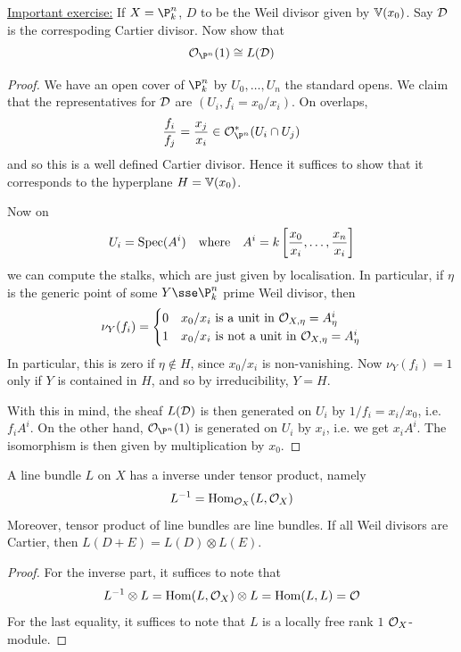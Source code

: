 \documentclass{article}
\begin{document}
\underline{Important exercise:} If \(X = \P^n_k\), \(D\) to be the Weil divisor given by \(\mathbb{V}(x_0)\). Say \(\mathcal{D}\) is the correspoding Cartier divisor. Now show that
\[\mcO_{\P^n}(1) \cong L(\mcD)\]

\begin{addendum}
    \begin{proof}
        We have an open cover of \(\P^n_k\) by \(U_0, \dots, U_n\) the standard opens. We claim that the representatives for \(\mathcal{D}\) are \((U_i, f_i = x_0/x_i)\). On overlaps,
        \[\frac{f_i}{f_j} = \frac{x_j}{x_i} \in \mcO^*_{\P^n}(U_i \cap U_j)\]
        and so this is a well defined Cartier divisor. Hence it suffices to show that it corresponds to the hyperplane \(H = \mathbb{V}(x_0)\).

        Now on
        \[U_i = \Spec(A^i) \qqtext{where}A^i = k\left[\frac{x_0}{x_i}, \dots, \frac{x_n}{x_i}\right]\]
        we can compute the stalks, which are just given by localisation. In particular, if \(\eta\) is the generic point of some \(Y \sse \P^n_k\) prime Weil divisor, then
        \[\nu_Y(f_i) = \begin{cases}
            0 & x_0/x_i \text{ is a unit in }\mathcal{O}_{X, \eta} = A^i_\eta \\
            1 & x_0/x_i \text{ is not a unit in }\mathcal{O}_{X, \eta} = A^i_\eta
        \end{cases}\]
        In particular, this is zero if \(\eta \notin H\), since \(x_0/x_i\) is non-vanishing. Now \(\nu_Y(f_i) = 1\) only if \(Y\) is contained in \(H\), and so by irreducibility, \(Y = H\). 
        
        With this in mind, the sheaf \(L(\mathcal{D})\) is then generated on \(U_i\) by \(1/f_i = x_i/x_0\), i.e. \(f_iA^i\). On the other hand, \(\mcO_{\P^n}(1)\) is generated on \(U_i\) by \(x_i\), i.e. we get \(x_iA^i\). The isomorphism is then given by multiplication by \(x_0\).
    \end{proof}
\end{addendum}

\begin{remark}
    A line bundle \(L\) on \(X\) has a inverse under tensor product, namely
    \[L^{-1} = \operatorname{Hom}_{\mathcal{O}_X}(L, \mathcal{O}_X)\]
    Moreover, tensor product of line bundles are line bundles. If all Weil divisors are Cartier, then \(L(D + E) = L(D) \otimes L(E)\).
\end{remark}

\begin{addendum}
    \begin{proof}
        For the inverse part, it suffices to note that
        \[L^{-1}\otimes L = \operatorname{Hom}(L, \mathcal{O}_X) \otimes L = \operatorname{Hom}(L, L) = \mathcal{O}\]
        For the last equality, it suffices to note that \(L\) is a locally free rank \(1\) \(\mathcal{O}_X\)-module.
    \end{proof}
\end{addendum}
\end{document}
